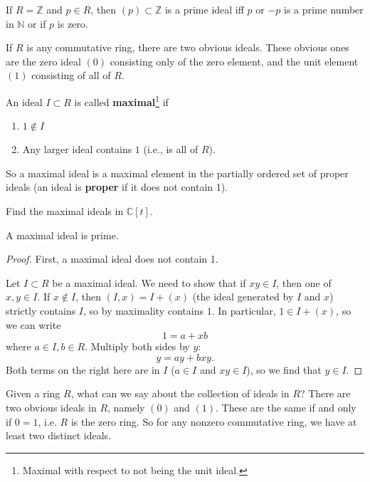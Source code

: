 \begin{example}
\label{integerprimes}
If $R = \mathbb{Z}$ and $p \in R$, then $(p) \subset \mathbb{Z}$ is a prime ideal iff $p$ or $-p$ is a
prime number in $\mathbb{N}$ or if $p$ is zero. 
\end{example} 



If $R$ is any commutative ring, there are two obvious ideals. These obvious
ones are the zero ideal $(0)$
consisting only of the zero element, and the unit element $(1)$ consisting of all of
$R$.


\begin{definition} \label{maximalideal}
An ideal $I \subset R$ is called \textbf{maximal}\footnote{Maximal with
respect to not being the unit ideal.} if 
\begin{enumerate}[\textbf{M} 1]
\item  $1 \notin I$
\item Any larger ideal contains $1$ (i.e., is all of $R$).
\end{enumerate}
\end{definition} 

So a maximal ideal is a maximal element in the partially ordered set of proper
ideals (an ideal is \textbf{proper} if it does not contain 1).

\begin{exercise} 
Find the maximal ideals in $\mathbb{C}[t]$.
\end{exercise} 


\begin{proposition} 
A maximal ideal is prime.
\end{proposition} 
\begin{proof} 
First, a maximal ideal does not contain 1.

Let $I \subset R$ be a maximal ideal.
We need to show that if $xy \in I$,
then one of $x,y \in I$.  If $x \notin I$, then $(I,x) = I + (x)$ (the ideal
generated by $I$ and $x$) strictly contains $I$, so by maximality contains
$1$.  In particular, $1 \in I+(x)$, so we can write
\[ 1 = a + xb  \]
where $a \in I, b \in R$. Multiply both sides by $y$:
\[ y = ay  + bxy.  \]
Both terms on the right here are in $I$ ($a \in I$ and $xy \in I$), so we find
that $y \in I$.

\end{proof} 

Given a ring $R$, what can we say about the collection of ideals in $R$?
There
are two obvious ideals in $R$, namely $(0)$ and $ (1)$.  These are the same if and
only if $0=1$, i.e. $R$ is the zero ring.
So for any nonzero commutative ring, we have at least two distinct ideals.  

